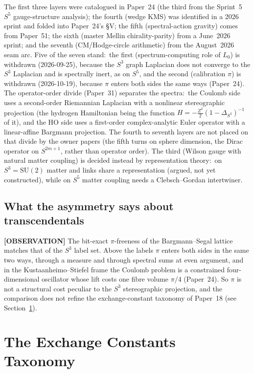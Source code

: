 \documentclass[aps,pra,twocolumn,superscriptaddress,longbibliography]{revtex4-2}
\newcommand{\gvc}[2]{#2}
\begin{document}
The first three layers were catalogued in Paper~24 (the third from the
Sprint~5 $S^5$ gauge-structure analysis); the fourth (wedge KMS)
was identified in a 2026 sprint and folded into Paper~24's \S{}V; the
fifth (spectral-action gravity) comes from Paper~51; the sixth
(master Mellin chirality-parity) from a June~2026 sprint; and the seventh
(CM/Hodge-circle arithmetic) from the August~2026 seam arc.  Five of the
seven stand:\ the first (spectrum-computing role of $L_0$) is withdrawn
(2026-09-25), because \gvc{graph-s3-wall}{the $S^3$ graph Laplacian does not converge to the
$S^3$ Laplacian and is spectrally inert, as on $S^5$}, and the second
(calibration $\pi$) is withdrawn (2026-10-19), because $\pi$ enters
both sides the same ways (Paper~24).  The operator-order divide
(Paper~31) separates the spectra:\ the
Coulomb side uses a second-order Riemannian Laplacian with a nonlinear
stereographic projection (the hydrogen Hamiltonian being the function
$H = -\tfrac{Z^2}{2}(1-\Delta_{S^3})^{-1}$ of it), and the HO side uses a first-order
complex-analytic Euler operator with a linear-affine Bargmann projection.
The fourth to seventh layers are not placed on that divide by the owner
papers (the fifth turns on sphere dimension, the Dirac operator on
$S^{2m+1}$, rather than operator order).
The third (Wilson gauge with natural matter coupling) is decided instead
by representation theory:\ on $S^3 = \mathrm{SU}(2)$ matter and links
share a representation (argued, not yet constructed), while on $S^5$
matter coupling needs a Clebsch--Gordan intertwiner.

\subsection*{What the asymmetry says about transcendentals}

\textbf{[OBSERVATION]} The bit-exact $\pi$-freeness of the
Bargmann--Segal lattice matches that of the $S^3$ label set.  Above the
labels $\pi$ enters both sides in the same two ways, through a measure
and through spectral sums at even argument, and in the
Kustaanheimo--Stiefel frame the Coulomb problem is a constrained
four-dimensional oscillator whose lift costs one fibre volume $\pi/4$
(Paper~24).  So $\pi$ is not a structural cost peculiar to the $S^3$
stereographic projection, and the comparison does not refine the
exchange-constant taxonomy of Paper~18 (see
Section~\ref{sec:exchange}).

\section{The Exchange Constants Taxonomy}
\label{sec:exchange}
\end{document}
